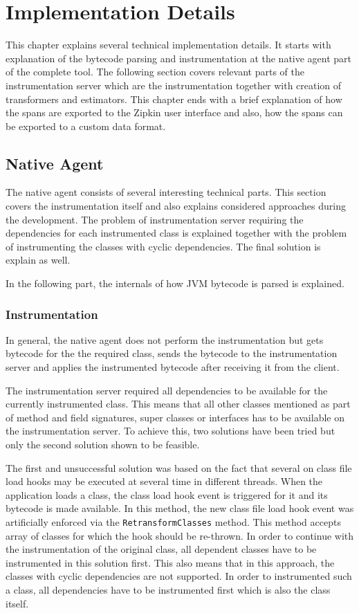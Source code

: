\chapter{Implementation Details}
\label{chap:implementation}
This chapter explains several technical implementation details. It starts with explanation of the bytecode parsing and instrumentation at the native agent part of the complete tool. The following section covers relevant parts of the instrumentation server which are the instrumentation together with creation of transformers and estimators. This chapter ends with a brief explanation of how the spans are exported to the Zipkin user interface and also, how the spans can be exported to a custom data format.

\section{Native Agent}
The native agent consists of several interesting technical parts. This section covers the instrumentation itself and also explains considered approaches during the development. The problem of instrumentation server requiring the dependencies for each instrumented class is explained together with the problem of instrumenting the classes with cyclic dependencies. The final solution is explain as well. 

In the following part, the internals of how JVM bytecode is parsed is explained.
\subsection{Instrumentation}
In general, the native agent does not perform the instrumentation but gets bytecode for the the required class, sends the bytecode to the instrumentation server and applies the instrumented bytecode after receiving it from the client. 

The instrumentation server required all dependencies to be available for the currently instrumented class. This means that all other classes mentioned as part of method and field signatures, super classes or interfaces has to be available on the instrumentation server. To achieve this, two solutions have been tried but only the second solution shown to be feasible.

The first and unsuccessful solution was based on the fact that several on class file load hooks may be executed at several time in different threads. When the application loads a class, the class load hook event is triggered for it and its bytecode is made available. In this method, the new class file load hook event was artificially enforced via the \texttt{RetransformClasses} method. This method accepts array of classes for which the hook should be re-thrown. In order to continue with the instrumentation of the original class, all dependent classes have to be instrumented in this solution first. This also means that in this approach, the classes with cyclic dependencies are not supported. In order to instrumented such a class, all dependencies have to be instrumented first which is also the class itself.

